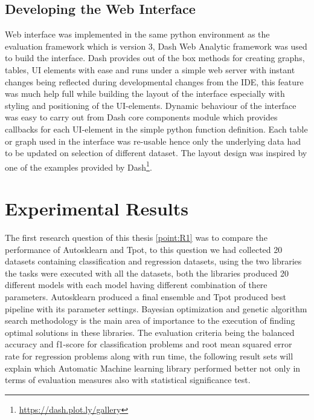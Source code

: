 \subsection{Developing the Web Interface}
Web interface was implemented in the same python environment as the evaluation framework which is version 3, Dash Web Analytic framework was used to build the interface. Dash provides out of the box methods for creating graphs, tables, UI elements with ease and runs under a simple web server with instant changes being reflected during developmental changes from the IDE, this feature was much help full while building the layout of the interface especially with styling and positioning of the UI-elements. Dynamic behaviour of the interface was easy to carry out from Dash core components module which provides callbacks for each UI-element in the simple python function definition. Each table or graph used in the interface was re-usable hence only the underlying data had to be updated on selection of different dataset. The layout design was inspired by one of the examples provided by Dash\footnote{\url{https://dash.plot.ly/gallery}}. 

\section{Experimental Results}

The first research question of this thesis \ref{point:R1} was to compare the performance of Autosklearn and Tpot, to this question we had collected 20 datasets containing classification and regression datasets, using the two libraries the tasks were executed with all the datasets, both the libraries produced 20 different models with each model having different combination of there parameters. Autosklearn produced a final ensemble and Tpot produced best pipeline with its parameter settings. Bayesian optimization and genetic algorithm search methodology is the main area of importance to the execution of finding optimal solutions in these libraries. The evaluation criteria being the balanced accuracy and f1-score for classification problems and root mean squared error rate for regression problems along with run time, the following result sets will explain which Automatic Machine learning library performed better not only in terms of  evaluation measures also with statistical significance test.

